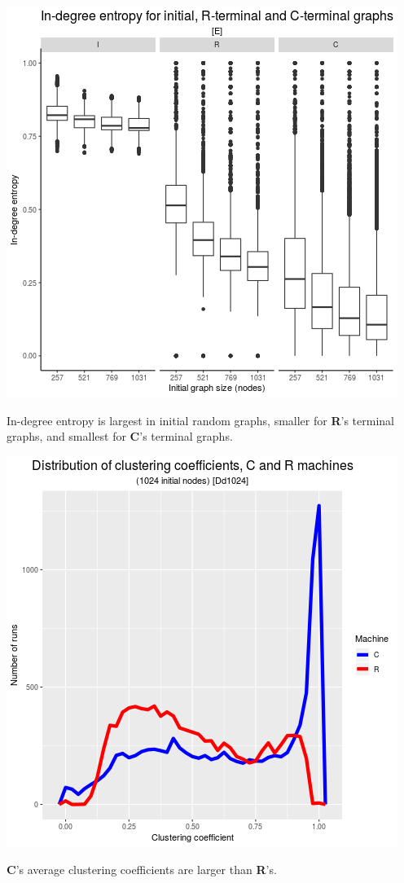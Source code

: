 \documentclass{tufte-handout}
\begin{document}
\begin{marginfigure}
  \includegraphics{figE.png}
  \caption{In-degree entropy is largest in initial random graphs,
        smaller for \textbf{R}'s terminal graphs, and smallest for \textbf{C}'s terminal graphs.}
  \label{fig:figE}
\end{marginfigure}

\begin{marginfigure}
  \includegraphics{figDd1024.png}
  \caption{\textbf{C}'s average clustering coefficients are larger than \textbf{R}'s.}
  \label{fig:figDd1024}
\end{marginfigure}
\end{document}
